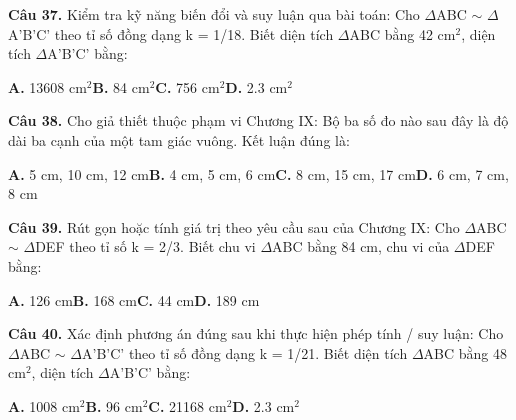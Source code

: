 \documentclass[11pt,a4paper]{article}
\begin{document}
\textbf{\color{primary} Câu 37.} Kiểm tra kỹ năng biến đổi và suy luận qua bài toán: Cho $\Delta$ABC $\sim$ $\Delta$A'B'C' theo tỉ số đồng dạng k = 1/18. Biết diện tích $\Delta$ABC bằng 42 cm$^2$, diện tích $\Delta$A'B'C' bằng:\par
\hspace*{1.5em}\textbf{A.} 13608 cm$^2$\quad\quad \textbf{B.} 84 cm$^2$\quad\quad \textbf{C.} 756 cm$^2$\quad\quad \textbf{D.} 2.3 cm$^2$\par\vspace{2pt}
\textbf{\color{primary} Câu 38.} Cho giả thiết thuộc phạm vi Chương IX: Bộ ba số đo nào sau đây là độ dài ba cạnh của một tam giác vuông. Kết luận đúng là:\par
\hspace*{1.5em}\textbf{A.} 5 cm, 10 cm, 12 cm\quad\quad \textbf{B.} 4 cm, 5 cm, 6 cm\quad\quad \textbf{C.} 8 cm, 15 cm, 17 cm\quad\quad \textbf{D.} 6 cm, 7 cm, 8 cm\par\vspace{2pt}
\textbf{\color{primary} Câu 39.} Rút gọn hoặc tính giá trị theo yêu cầu sau của Chương IX: Cho $\Delta$ABC $\sim$ $\Delta$DEF theo tỉ số k = 2/3. Biết chu vi $\Delta$ABC bằng 84 cm, chu vi của $\Delta$DEF bằng:\par
\hspace*{1.5em}\textbf{A.} 126 cm\quad\quad \textbf{B.} 168 cm\quad\quad \textbf{C.} 44 cm\quad\quad \textbf{D.} 189 cm\par\vspace{2pt}
\textbf{\color{primary} Câu 40.} Xác định phương án đúng sau khi thực hiện phép tính / suy luận: Cho $\Delta$ABC $\sim$ $\Delta$A'B'C' theo tỉ số đồng dạng k = 1/21. Biết diện tích $\Delta$ABC bằng 48 cm$^2$, diện tích $\Delta$A'B'C' bằng:\par
\hspace*{1.5em}\textbf{A.} 1008 cm$^2$\quad\quad \textbf{B.} 96 cm$^2$\quad\quad \textbf{C.} 21168 cm$^2$\quad\quad \textbf{D.} 2.3 cm$^2$\par\vspace{2pt}
\end{document}
